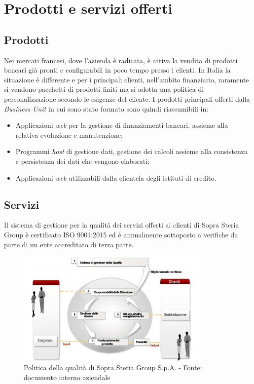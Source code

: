 \section{Prodotti e servizi offerti}
	
	\subsection{Prodotti}
	
	Nei mercati francesi, dove l'azienda è radicata, è attiva la vendita di prodotti bancari già pronti e configurabili in poco tempo presso i clienti. In Italia la situazione è differente e per i principali clienti, nell'ambito finanziario, raramente si vendono pacchetti di prodotti finiti ma si adotta una politica di personalizzazione secondo le esigenze del cliente. I prodotti principali offerti dalla \textit{Business Unit} in cui sono stato formato sono quindi riassumibili in:
		
	\begin{itemize}
		\item Applicazioni \textit{web} per la gestione di finanziamenti bancari, assieme alla relativa evoluzione e manutenzione;
		\item Programmi \textit{host} di gestione dati, gestione dei calcoli assieme alla consistenza e persistenza dei dati che vengono elaborati;
		\item Applicazioni \textit{web} utilizzabili dalla clientela degli istituti di credito.
	\end{itemize}
	
	\subsection{Servizi}
	
	Il sistema di gestione per la qualità dei servizi offerti ai clienti di Sopra Steria Group è certificato ISO 9001:2015 ed è annualmente sottoposto a verifiche da parte di un ente accreditato di terza parte.\\

	\begin{figure}[H]
	\centering
   	\includegraphics[width=0.85\textwidth]{immagini/ISO9001}
   	\caption{Politica della qualità di Sopra Steria Group S.p.A. - Fonte: documento interno aziendale}
	\end{figure}
	
